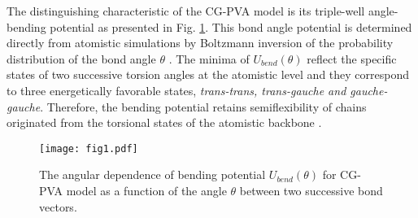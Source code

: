 \documentclass[pre,showpacs,notitlepage,twocolumn]{revtex4-1}
\begin{document}
 The distinguishing characteristic of the CG-PVA model  is its triple-well angle-bending potential   \cite{Meyer2001} as presented in Fig. \ref{fig1}. 
 This  bond angle potential is determined directly from atomistic simulations  by Boltzmann inversion of  the probability distribution of the bond angle  $\theta$ \cite{Reith,Meyer2001}. The  minima of   $U_{bend}(\theta)$ reflect the specific states of two successive torsion angles at the atomistic level and they correspond to three energetically favorable states, {\it trans-trans, trans-gauche and gauche-gauche}. 
 Therefore, the bending potential  retains semiflexibility of chains   originated from the torsional states of the   atomistic backbone \cite {Meyer2001}. 


 
 
 \begin{figure}[t]
\texttt{[image: fig1.pdf]}
\caption{The angular dependence of bending potential  $U_{bend} (\theta)$ for CG-PVA model as a function of the angle $\theta$ between two successive bond vectors. }
\label{fig1} 
\end{figure}
%
\end{document}
